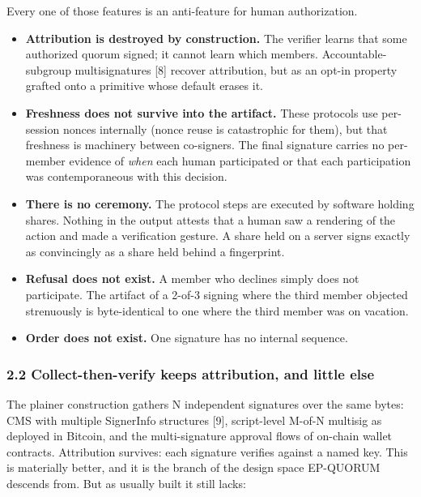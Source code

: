 \documentclass[
  11pt,
]{article}
\providecommand{\tightlist}{%
  \setlength{\itemsep}{0pt}\setlength{\parskip}{0pt}}
\begin{document}
Every one of those features is an anti-feature for human authorization.

\begin{itemize}
\tightlist
\item
  \textbf{Attribution is destroyed by construction.} The verifier learns
  that some authorized quorum signed; it cannot learn which members.
  Accountable-subgroup multisignatures {[}8{]} recover attribution, but
  as an opt-in property grafted onto a primitive whose default erases
  it.
\item
  \textbf{Freshness does not survive into the artifact.} These protocols
  use per-session nonces internally (nonce reuse is catastrophic for
  them), but that freshness is machinery between co-signers. The final
  signature carries no per-member evidence of \emph{when} each human
  participated or that each participation was contemporaneous with this
  decision.
\item
  \textbf{There is no ceremony.} The protocol steps are executed by
  software holding shares. Nothing in the output attests that a human
  saw a rendering of the action and made a verification gesture. A share
  held on a server signs exactly as convincingly as a share held behind
  a fingerprint.
\item
  \textbf{Refusal does not exist.} A member who declines simply does not
  participate. The artifact of a 2-of-3 signing where the third member
  objected strenuously is byte-identical to one where the third member
  was on vacation.
\item
  \textbf{Order does not exist.} One signature has no internal sequence.
\end{itemize}

\subsubsection{2.2 Collect-then-verify keeps attribution, and little
else}\label{collect-then-verify}

The plainer construction gathers N independent signatures over the same
bytes: CMS with multiple SignerInfo structures {[}9{]}, script-level
M-of-N multisig as deployed in Bitcoin, and the multi-signature approval
flows of on-chain wallet contracts. Attribution survives: each signature
verifies against a named key. This is materially better, and it is the
branch of the design space EP-QUORUM descends from. But as usually built
it still lacks:
\end{document}
